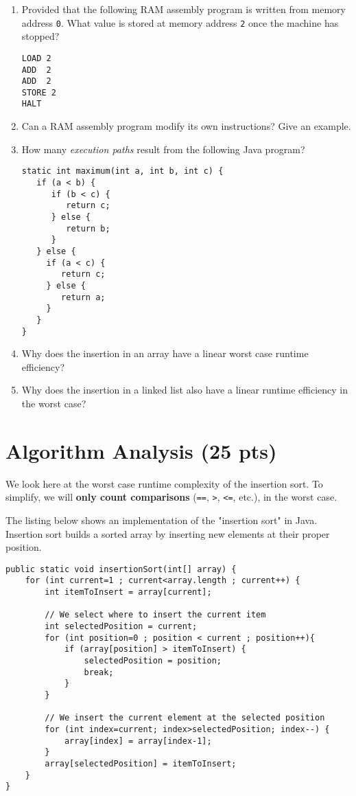 \documentclass[11pt]{article}
\begin{document}
\begin{enumerate}
\item Provided that the following RAM assembly program is written from
memory address \texttt{0}. What value is stored at memory address \texttt{2}
once the machine has stopped?
\begin{verbatim}
LOAD 2
ADD  2
ADD  2
STORE 2
HALT
\end{verbatim}

\item Can a RAM assembly program modify its own instructions? Give an
example.

\item How many \emph{execution paths} result from the following Java
program?
\begin{verbatim}
static int maximum(int a, int b, int c) {
   if (a < b) {
      if (b < c) {
         return c;
      } else {
         return b;
      }
   } else {
     if (a < c) {
        return c;
     } else {
        return a;
     }
   }
}
\end{verbatim}

\item Why does the insertion in an array have a linear worst case
runtime efficiency?

\item Why does the insertion in a linked list also have a linear runtime
efficiency in the worst case?
\end{enumerate}


\section{Algorithm Analysis (25 pts)}
\label{sec:org1ce7c40}

We look here at the worst case runtime complexity of the insertion
sort. To simplify, we will \textbf{only count comparisons} (\texttt{==}, \texttt{>},
\texttt{<=}, etc.), in the worst case.

The listing below shows an implementation of the "insertion sort" in
Java. Insertion sort builds a sorted array by inserting new elements
at their proper position.

\begin{verbatim}
public static void insertionSort(int[] array) {
    for (int current=1 ; current<array.length ; current++) {
        int itemToInsert = array[current];

        // We select where to insert the current item
        int selectedPosition = current;
        for (int position=0 ; position < current ; position++){
            if (array[position] > itemToInsert) {
                selectedPosition = position;
                break;
            }
        }

        // We insert the current element at the selected position
        for (int index=current; index>selectedPosition; index--) {
            array[index] = array[index-1];
        }
        array[selectedPosition] = itemToInsert;
    }
}
\end{verbatim}
\end{document}

